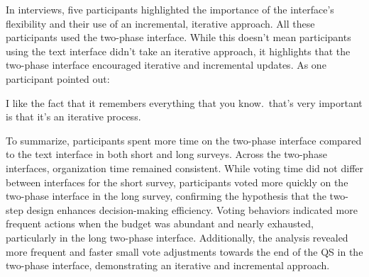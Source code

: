 In interviews, five participants highlighted the importance of the interface's flexibility and their use of an incremental, iterative approach. All these participants used the two-phase interface. While this doesn't mean participants using the text interface didn't take an iterative approach, it highlights that the two-phase interface encouraged iterative and incremental updates. As one participant pointed out:

\begin{displayquote}
I like the fact that it remembers everything that you know.~\bracketellipsis that's very important is that it's an iterative process.\hfill{}
\end{displayquote}

To summarize, participants spent more time on the two-phase interface compared to the text interface in both short and long surveys. Across the two-phase interfaces, organization time remained consistent. While voting time did not differ between interfaces for the short survey, participants voted more quickly on the two-phase interface in the long survey, confirming the hypothesis that the two-step design enhances decision-making efficiency. Voting behaviors indicated more frequent actions when the budget was abundant and nearly exhausted, particularly in the long two-phase interface. Additionally, the analysis revealed more frequent and faster small vote adjustments towards the end of the QS in the two-phase interface, demonstrating an iterative and incremental approach. 


